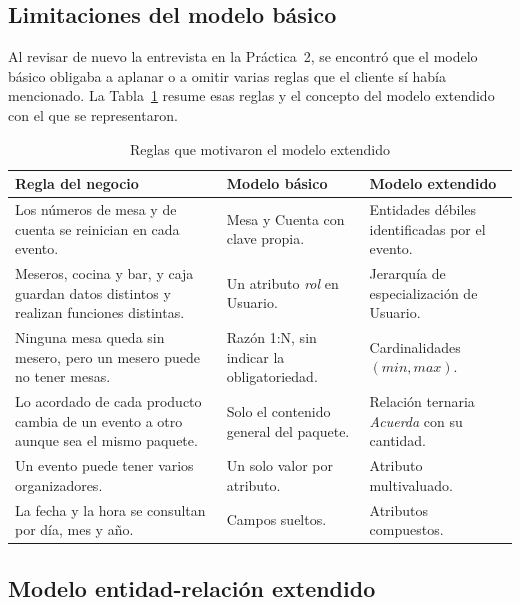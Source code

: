 \subsection{Limitaciones del modelo básico}

Al revisar de nuevo la entrevista en la Práctica~2, se encontró que el modelo básico obligaba a aplanar o a omitir varias reglas que el cliente sí había mencionado. La Tabla~\ref{tab:er-a-eer} resume esas reglas y el concepto del modelo extendido con el que se representaron.

\begin{table}[H]
    \centering
    \small
    \begin{tabularx}{\textwidth}
        {
            >{\RaggedRight\arraybackslash}X
            >{\RaggedRight\arraybackslash}p{4.2cm}
            >{\RaggedRight\arraybackslash}p{4.2cm}
        }
        \toprule
        \textbf{Regla del negocio} & \textbf{Modelo básico} & \textbf{Modelo extendido} \\
        \midrule
        Los números de mesa y de cuenta se reinician en cada evento. & Mesa y Cuenta con clave propia. & Entidades débiles identificadas por el evento. \\
        Meseros, cocina y bar, y caja guardan datos distintos y realizan funciones distintas. & Un atributo \textit{rol} en Usuario. & Jerarquía de especialización de Usuario. \\
        Ninguna mesa queda sin mesero, pero un mesero puede no tener mesas. & Razón 1:N, sin indicar la obligatoriedad. & Cardinalidades $(\mathit{min}, \mathit{max})$. \\
        Lo acordado de cada producto cambia de un evento a otro aunque sea el mismo paquete. & Solo el contenido general del paquete. & Relación ternaria \textit{Acuerda} con su cantidad. \\
        Un evento puede tener varios organizadores. & Un solo valor por atributo. & Atributo multivaluado. \\
        La fecha y la hora se consultan por día, mes y año. & Campos sueltos. & Atributos compuestos. \\
        \bottomrule
    \end{tabularx}
    \captionsetup{labelfont=bf, textfont=it, labelsep=newline, justification=raggedright, singlelinecheck=false}
    \caption{Reglas que motivaron el modelo extendido}
    \label{tab:er-a-eer}
\end{table}

\subsection{Modelo entidad-relación extendido}

